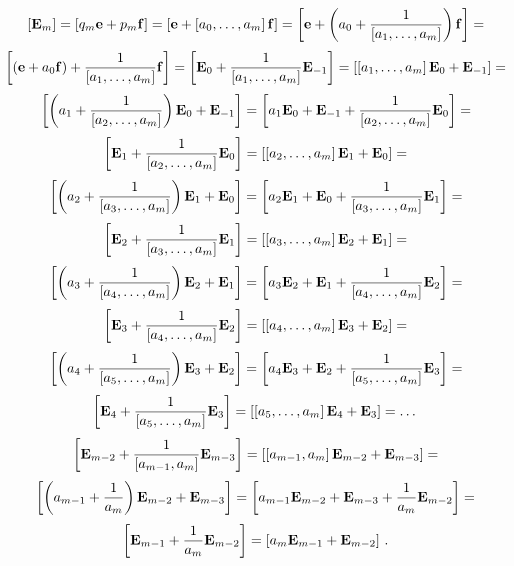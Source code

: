      $$
[{\bf E}_{m}]=[q_{m}{\bf e}+p_{m}{\bf f}]=
\left[{\bf e}+\left[a_0,\dots,a_m\right]{\bf f}\right]=
\left[{\bf e}+\left(a_0+
  {1\over\left[a_1,\dots,a_m\right]}\right){\bf f}\right]=
     $$
      $$
\left[\left({\bf e}+a_0{\bf f}\right)+
  {1\over\left[a_1,\dots,a_m\right]}{\bf f}\right]=
\left[{\bf E}_0+
  {1\over\left[a_1,\dots,a_m\right]}{\bf E}_{-1}\right]=
\left[\left[a_1,\dots,a_m\right]{\bf E}_0+
  {\bf E}_{-1}\right]=
      $$
      $$
\left[\left(a_1+{1\over \left[a_2,\dots,a_m\right]}\right){\bf E}_0+
  {\bf E}_{-1}\right]=
\left[a_1{\bf E}_0+{\bf E}_{-1}+{1\over \left[a_2,\dots,a_m\right]}{\bf E}_0
 \right]=
      $$    
       $$
\left[{\bf E}_{1}+{1\over \left[a_2,\dots,a_m\right]}{\bf E}_0
 \right]=
\left[\left[a_2,\dots,a_m\right]{\bf E}_{1}+
{\bf E}_0
 \right]=
       $$ 
        $$
\left[\left(a_2+{1\over \left[a_3,\dots,a_m\right]}\right){\bf E}_{1}+
{\bf E}_0
 \right]=\left[a_2{\bf E}_1+{\bf E}_{0}+
{1\over \left[a_3,\dots,a_m\right]}{\bf E}_1
 \right]=
      $$    
       $$
\left[{\bf E}_{2}+{1\over \left[a_3,\dots,a_m\right]}{\bf E}_1
 \right]=
\left[\left[a_3,\dots,a_m\right]{\bf E}_{2}+
{\bf E}_1
 \right]=
       $$ 
        $$
\left[\left(a_3+{1\over \left[a_4,\dots,a_m\right]}\right){\bf E}_{2}+
{\bf E}_1
 \right]=\left[a_3{\bf E}_2+{\bf E}_{1}+
{1\over \left[a_4,\dots,a_m\right]}{\bf E}_2
 \right]=
      $$     $$
\left[{\bf E}_{3}+{1\over \left[a_4,\dots,a_m\right]}{\bf E}_2
 \right]=
\left[\left[a_4,\dots,a_m\right]{\bf E}_{3}+
{\bf E}_2
 \right]=
       $$ 
         $$
\left[\left(a_4+
{1\over \left[a_5,\dots,a_m\right]}\right){\bf E}_{3}+
{\bf E}_2
 \right]=\left[a_4{\bf E}_3+{\bf E}_{2}+
{1\over \left[a_5,\dots,a_m\right]}{\bf E}_3
 \right]=
      $$     $$
\left[{\bf E}_{4}+{1\over \left[a_5,\dots,a_m\right]}{\bf E}_3
 \right]=
\left[\left[a_5,\dots,a_m\right]{\bf E}_{4}+
{\bf E}_3
 \right]=\dots
       $$ 
      $$
 \left[ {\bf E}_{m-2}+{1\over \left[a_{m-1},a_m\right]}{\bf E}_{m-3}\right]=
 \left[\left[a_{m-1},a_m\right] {\bf E}_{m-2}+{\bf E}_{m-3}\right]=
      $$
        $$
 \left[\left(a_{m-1}+{1\over a_m}\right){\bf E}_{m-2}+{\bf E}_{m-3}\right]=
 \left[a_{m-1}{\bf E}_{m-2}+{\bf E}_{m-3}+{1\over a_m}{\bf E}_{m-2}\right]=
          $$
           $$
 \left[ {\bf E}_{m-1}+{1\over a_m}{\bf E}_{m-2}\right]=
 \left[a_m {\bf E}_{m-1}+{\bf E}_{m-2}\right]\,.
      $$

\bye
